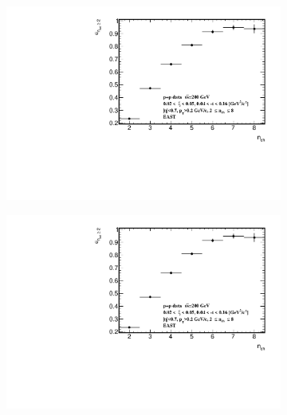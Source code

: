 \begin{figure}[h!]
	\centering
	\vspace{-2.5cm}
	\begin{subfigure}{.49\textwidth}
		\includegraphics[width=\textwidth,page=77]{chapters/chrgSTAR/img/syst/outSD.pdf}
	\end{subfigure}
	\begin{subfigure}{.49\textwidth}
		\includegraphics[width=\textwidth,page=89]{chapters/chrgSTAR/img/syst/outSD.pdf}
	\end{subfigure}
	\begin{subfigure}{.49\textwidth}

\end{subfigure}
\end{figure}
